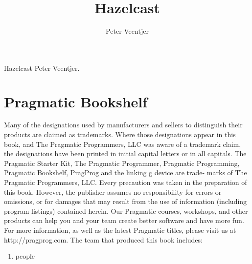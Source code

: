 \documentclass{book}
\begin{document}
\pagestyle{empty}
\title{\textbf{Hazelcast}}
\author{Peter Veentjer}

\maketitle


\thispagestyle{empty}
Hazelcast
Peter Veentjer.
\newpage


\pagestyle{fancy}
\fancyhf{}
\lhead[]{\thepage}
\rhead[\thepage]{}


\doublespacing



\chapter*{Pragmatic Bookshelf}
Many of the designations used by manufacturers and sellers to distinguish their products are claimed as trademarks. Where those designations appear in this book, and The Pragmatic Programmers, LLC was aware of a trademark claim, the designations have been printed in initial capital letters or in all capitals. The Pragmatic Starter Kit, The Pragmatic Programmer, Pragmatic Programming, Pragmatic Bookshelf, PragProg and the linking g device are trade- marks of The Pragmatic Programmers, LLC.
Every precaution was taken in the preparation of this book. However, the publisher assumes no responsibility for errors or omissions, or for damages that may result from the use of information (including program listings) contained herein.
Our Pragmatic courses, workshops, and other products can help you and your team create better software and have more fun. For more information, as well as the latest Pragmatic titles, please visit us at http://pragprog.com.
The team that produced this book includes:
\begin{enumerate}
\item people
\end{enumerate}



\renewcommand{\cftchapdotsep}{\cftdotsep}

\tableofcontents








\end{document}
